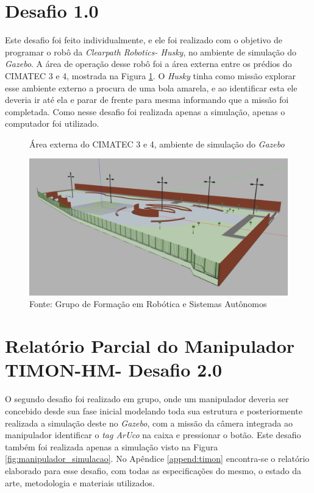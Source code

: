 \section{Desafio 1.0 }
\label{sec:desafio_1}
Este desafio foi feito individualmente, e ele foi realizado com o objetivo de programar o robô da \textit{Clearpath Robotics- Husky}, no ambiente de simulação do \textit{Gazebo}. A área de operação desse robô foi a área externa entre os prédios do CIMATEC 3 e 4, mostrada na Figura \ref{fig:cimatec3_4}. O \textit{Husky} tinha como missão explorar esse ambiente externo a procura de uma bola amarela, e ao identificar esta ele deveria ir até ela e parar de frente para mesma informando que a missão foi completada. Como nesse desafio foi realizada apenas a simulação, apenas o computador foi utilizado.  


\begin{figure}[H]
    \caption{Área externa do CIMATEC 3 e 4, ambiente de simulação do \textit{Gazebo}}
    \centering
    \includegraphics[width= \textwidth]{Figures/cimatec4.png}
    \caption*{Fonte: Grupo de Formação em Robótica e Sistemas Autônomos}
    \label{fig:cimatec3_4}
\end{figure}



\section{Relatório Parcial do Manipulador TIMON-HM- Desafio 2.0 }
\label{sec:desafio_2}
O segundo desafio foi realizado em grupo, onde um manipulador deveria ser concebido desde sua fase inicial modelando toda sua estrutura e posteriormente realizada a simulação deste no \textit{Gazebo}, com a missão da câmera integrada ao manipulador identificar o \textit{tag ArUco} na caixa e pressionar o botão. Este desafio também foi realizada apenas a simulação visto na Figura \ref{fig:manipulador_simulacao}. No Apêndice \ref{append:timon} encontra-se o relatório elaborado para esse desafio, com todas as especificações do mesmo, o estado da arte, metodologia e materiais utilizados.

